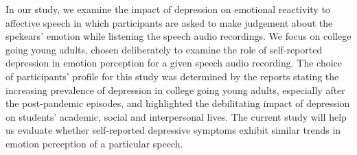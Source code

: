 \documentclass{Interspeech2024}
\begin{document}
In our study, we examine the impact of depression on emotional reactivity to affective speech in which participants are asked to make judgement about the spekears' emotion while listening the speech audio recordings. We focus on college going young adults, chosen deliberately to examine the role of self-reported depression in emotion perception for a given speech audio recording. The choice of participants' profile for this study was determined by the reports \cite{liu2022influencing} stating the increasing prevalence of depression in college going young adults, especially after the post-pandemic episodes, and highlighted the debilitating impact of depression on students' academic, social and interpersonal lives. The current study will help us evaluate whether self-reported depressive symptoms exhibit similar trends in emotion perception of a particular speech. 





\end{document}

